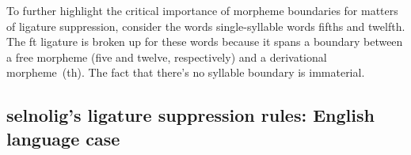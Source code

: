 \documentclass[11pt]{article}
\newcommand{\pkg}[1]{\textsf{#1}}
\begin{document}
To further highlight the critical importance of morpheme boundaries for matters of ligature suppression, consider the words single-syllable words fifths and twelfth. The ft ligature is broken up for these words because it spans a boundary between a free morpheme (five and twelve, respectively) and a derivational morpheme~(th). The fact that there's no syllable boundary is immaterial.

 



\subsection[selnolig's ligature suppression rules: English language case]{\pkg{selnolig}'s ligature suppression rules: English language case} \label{sec:english-rules}
\end{document}
